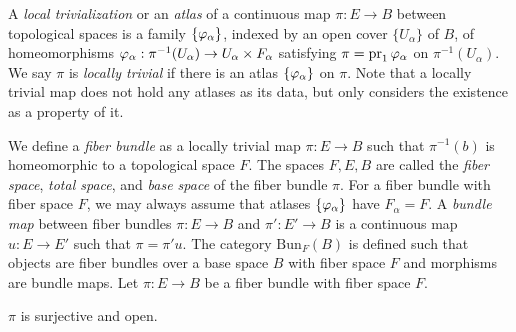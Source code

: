 \documentclass{../../large}
\begin{document}
\begin{prb}
A \emph{local trivialization} or an \emph{atlas} of a continuous map $\pi:E\to B$ between topological spaces is a family $\{\varphi_\alpha\}$, indexed by an open cover $\{U_\alpha\}$ of $B$, of homeomorphisms $\varphi_\alpha:\pi^{-1}(U_\alpha)\to U_\alpha\times F_\alpha$ satisfying $\pi=\operatorname{pr}_1\varphi_\alpha$ on $\pi^{-1}(U_\alpha)$.
We say $\pi$ is \emph{locally trivial} if there is an atlas $\{\varphi_\alpha\}$ on $\pi$.
Note that a locally trivial map does not hold any atlases as its data, but only considers the existence as a property of it.

We define a \emph{fiber bundle} as a locally trivial map $\pi:E\to B$ such that $\pi^{-1}(b)$ is homeomorphic to a topological space $F$.
The spaces $F,E,B$ are called the \emph{fiber space}, \emph{total space}, and \emph{base space} of the fiber bundle $\pi$.
For a fiber bundle with fiber space $F$, we may always assume that atlases $\{\varphi_\alpha\}$ have $F_\alpha=F$.
A \emph{bundle map} between fiber bundles $\pi:E\to B$ and $\pi':E'\to B$ is a continuous map $u:E\to E'$ such that $\pi=\pi'u$.
The category $\mathrm{Bun}_F(B)$ is defined such that objects are fiber bundles over a base space $B$ with fiber space $F$ and morphisms are bundle maps.
Let $\pi:E\to B$ be a fiber bundle with fiber space $F$.
\begin{parts}
\item 
\item $\pi$ is surjective and open.
\end{parts}
\end{prb}
\end{document}
